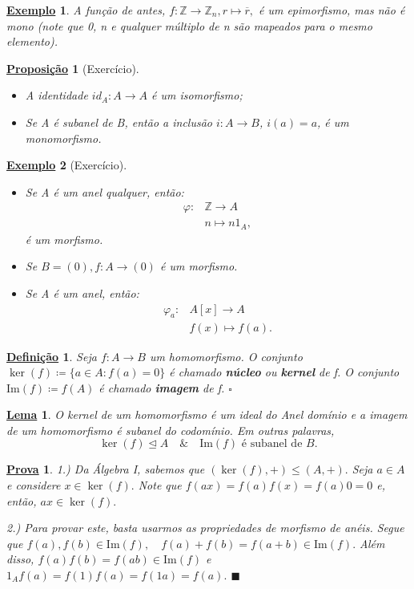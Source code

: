 \documentclass{article}
\newtheorem*{def*}{\underline{Defini\c c\~ao}}
\newtheorem*{lemma*}{\underline{Lema}}
\newtheorem*{prop*}{\underline{Proposi\c c\~ao}}
\newtheorem{example}{\underline{Exemplo}}
\newtheorem*{proof*}{\underline{Prova}}
\renewcommand\qedsymbol{$\blacksquare$}
\begin{document}
\begin{example}
  A função de antes, \(f:\mathbb{Z}\rightarrow \mathbb{Z}_{n}, r \mapsto \overline{r},\) é um epimorfismo, mas não é mono (note que 0, n e qualquer múltiplo de n
  são mapeados para o mesmo elemento).
\end{example}
\begin{prop*}[Exercício]
  \begin{itemize}
    \item[1)] A identidade \(id_{A}:A\rightarrow A\) é um isomorfismo;
    \item[2)] Se A é subanel de B, então a inclusão \(i:A\rightarrow B\), \(i(a) = a\), é
      um monomorfismo.
  \end{itemize}
\end{prop*}
\begin{example}[Exercício]
  \begin{itemize}
    \item[1)] Se A é um anel qualquer, então:
      \begin{align*}
        \varphi:&\mathbb{Z}\rightarrow A\\
                &n\mapsto n1_{A},
      \end{align*}
      é um morfismo.
    \item[2)] Se \(B=(0), f:A\rightarrow (0)\) é um morfismo.
    \item[3)] Se A é um anel, então:
      \begin{align*}
        \varphi_{a}:&A[x]\rightarrow A\\
                    &f(x)\mapsto f(a).
      \end{align*}
  \end{itemize}
\end{example}
\begin{def*}
  Seja \(f:A\rightarrow B\) um homomorfismo. O conjunto \(\ker{(f)}\coloneqq \{a\in A: f(a) = 0\}\)
  é chamado \textbf{núcleo} ou \textbf{kernel} de f. O conjunto \(\mathrm{Im}(f)\coloneqq f(A)\) é chamado 
  \textbf{imagem} de f. \(\square\)
\end{def*}
\begin{lemma*}
  O kernel de um homomorfismo é um ideal do Anel domínio e a imagem de um homomorfismo é subanel do codomínio. Em outras palavras,
  \[
    \ker{(f)}\trianglelefteq{A}\quad\&\quad \mathrm{Im}(f)\text{ é subanel de }B.
  \]
\end{lemma*}
\begin{proof*}
  1.) Da Álgebra I, sabemos que \((\ker{(f)}, +)\leq (A, +).\) Seja \(a\in A\) e 
  considere \(x\in\ker{(f)}.\) Note que \(f(ax) = f(a)f(x) = f(a)0 = 0\) e, então, \(ax\in\ker{(f)}.\)

  2.) Para provar este, basta usarmos as propriedades de morfismo de anéis. Segue que
  \(f(a), f(b)\in \mathrm{Im}(f),\quad f(a) + f(b) = f(a+b)\in \mathrm{Im}(f).\) Além disso,
  \(f(a)f(b) = f(ab)\in \mathrm{Im}(f)\) e \(1_{A}f(a) = f(1)f(a) = f(1a) = f(a).\) \qedsymbol
\end{proof*}
\end{document}
